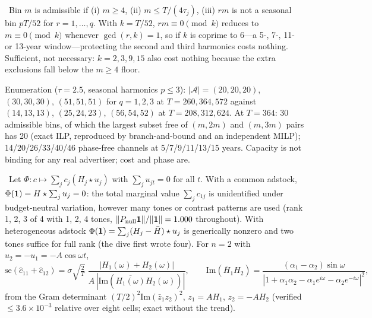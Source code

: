\begin{law}
\label{ident:law:ruleR}
\tagEstablished\ Bin $m$ is admissible if (i) $m \ge 4$, (ii) $m \le T/(4\tau_j)$, (iii) $rm$ is not a seasonal bin $pT/52$ for $r = 1, \ldots, q$. With $k = T/52$, $rm \equiv 0 \pmod k$ reduces to $m \equiv 0 \pmod k$ whenever $\gcd(r, k) = 1$, so if $k$ is coprime to 6---a 5-, 7-, 11- or 13-year window---protecting the second and third harmonics costs nothing. Sufficient, not necessary: $k = 2, 3, 9, 15$ also cost nothing because the extra exclusions fall below the $m \ge 4$ floor.
\end{law}

Enumeration ($\tau = 2.5$, seasonal harmonics $p \le 3$): $|\mathcal A| = (20, 20, 20)$, $(30, 30, 30)$, $(51, 51, 51)$ for $q = 1, 2, 3$ at $T = 260, 364, 572$ against $(14, 13, 13)$, $(25, 24, 23)$, $(56, 54, 52)$ at $T = 208, 312, 624$. At $T = 364$: 30 admissible bins, of which the largest subset free of $(m, 2m)$ and $(m, 3m)$ pairs has 20 (exact ILP, reproduced by branch-and-bound and an independent MILP); 14/20/26/33/40/46 phase-free channels at 5/7/9/11/13/15 years. Capacity is not binding for any real advertiser; cost and phase are.

\begin{theorem}
\label{ident:thm:rank}
\tagEstablished\ Let $\Phi : c \mapsto \sum_j c_j(H_j \star u_j)$ with $\sum_j u_{jt} = 0$ for all $t$. With a common adstock, $\Phi(\mathbf{1}) = H \star \sum_j u_j = 0$: the total marginal value $\sum_j c_{1j}$ is unidentified under budget-neutral variation, however many tones or contrast patterns are used (rank 1, 2, 3 of 4 with 1, 2, 4 tones, $\|P_{\rm null}\mathbf{1}\|/\|\mathbf{1}\| = 1.000$ throughout). With heterogeneous adstock $\Phi(\mathbf{1}) = \sum_j(H_j - \bar H) \star u_j$ is generically nonzero and two tones suffice for full rank (the dive first wrote four). For $n = 2$ with $u_2 = -u_1 = -A\cos\omega t$,
\begin{equation}
\mathrm{se}(\hat c_{11} + \hat c_{12}) = \sigma\sqrt{\tfrac{2}{T}}\;\frac{|H_1(\omega) + H_2(\omega)|}{A\,|\mathrm{Im}(\overline{H_1(\omega)}H_2(\omega))|}, \qquad
\mathrm{Im}(\bar H_1H_2) = \frac{(\alpha_1 - \alpha_2)\sin\omega}{|1 + \alpha_1\alpha_2 - \alpha_1e^{i\omega} - \alpha_2e^{-i\omega}|^2},
\label{ident:eq:escape}
\end{equation}
from the Gram determinant $(T/2)^2\mathrm{Im}(\bar z_1z_2)^2$, $z_1 = AH_1$, $z_2 = -AH_2$ (verified $\le 3.6\times10^{-3}$ relative over eight cells; exact without the trend).
\end{theorem}

